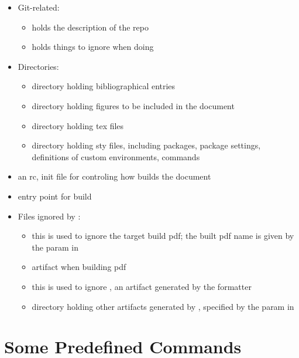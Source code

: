 \begin{itemize}
	\item Git-related:
	      \begin{itemize}
		      \item {} holds the description of the repo
		      \item {} holds things to ignore when doing 
	      \end{itemize}
	\item Directories:
	      \begin{itemize}
		      \item {} directory holding bibliographical entries
		      \item {} directory holding figures to be included in the document
		      \item {} directory holding tex files
		      \item {} directory holding sty files, including packages, package settings, definitions of custom environments, commands
	      \end{itemize}
	\item {} an rc, init file for controling how  builds the document
	\item {} entry point for build
	\item Files ignored by :
	      \begin{itemize}
		      \item {} this is used to ignore the target build pdf; the built pdf name is given by the  param in 
		      \item {} artifact when building pdf
		      \item {} this is used to ignore , an artifact generated by the formatter 
		      \item {} directory holding other artifacts generated by , specified by the  param in 
	      \end{itemize}
\end{itemize}

\section{Some Predefined Commands}
\label{sect:cmnds}

